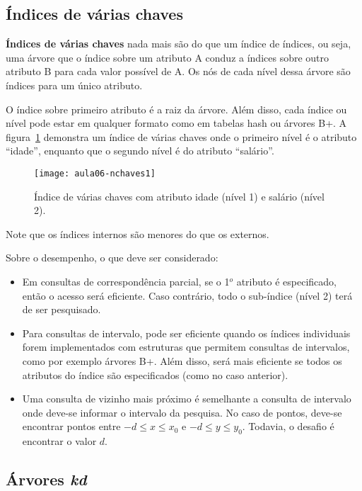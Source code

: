 \subsection{Índices de várias chaves}

\textbf{Índices de várias chaves} nada mais são do que um índice de índices, ou seja,
uma árvore que o índice sobre um atributo A conduz a índices sobre outro atributo B
para cada valor possível de A.
Os nós de cada nível dessa árvore são índices para um único atributo.

O índice sobre primeiro atributo é a raiz da árvore. Além disso, cada índice 
ou nível pode estar em qualquer formato como em tabelas hash ou árvores B+.
A figura~\ref{aula06:fig:nchaves1} demonstra um índice de várias chaves onde o
primeiro nível é o atributo ``idade'', enquanto que o segundo nível é do
atributo ``salário''.
%
\begin{figure}[!htb]
\centering
\texttt{[image: aula06-nchaves1]}
\caption{Índice de várias chaves com atributo idade (nível 1) e salário (nível 2).}
\label{aula06:fig:nchaves1}
\end{figure}
Note que os índices internos são menores do que os externos.

Sobre o desempenho, o que deve ser considerado:
\begin{itemize}
\item Em consultas de correspondência parcial, se o 1$^o$ atributo é especificado,
então o acesso será eficiente. Caso contrário, todo o sub-índice (nível 2) terá de 
ser pesquisado.

\item Para consultas de intervalo, pode ser eficiente quando os índices individuais forem
implementados com estruturas que permitem consultas de intervalos, como por exemplo
árvores B+. Além disso, será mais eficiente se todos os atributos do índice são
especificados (como no caso anterior).

\item Uma consulta de vizinho mais próximo é semelhante a consulta de intervalo onde
deve-se informar o intervalo da pesquisa. 
No caso de pontos, deve-se encontrar pontos entre $-d \leq x \leq x_0$ e 
$-d \leq y \leq y_0$. 
Todavia, o desafio é encontrar o valor $d$.
\end{itemize}

\subsection{Árvores \emph{kd}}

